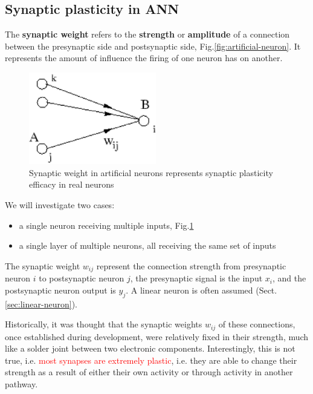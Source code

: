 \subsection{Synaptic plasticity in ANN}
\label{sec:synaptic_plasticity-ANN}


The {\bf synaptic weight} refers to the {\bf strength} or {\bf amplitude} of a
connection between the presynaptic side and postsynaptic side,
Fig.\ref{fig:artificial-neuron}.
It represents the amount of influence the firing of one neuron has on another.

\begin{figure}[hbt]
  \centerline{
  \includegraphics[height=4cm,
    angle=0]{./images/synaptic_plasticity_efficacy.eps}}
\caption{Synaptic weight in artificial neurons represents synaptic plasticity
efficacy in real neurons}
\label{fig:synaptic_plasticity_efficacy}
\end{figure}

We will investigate two cases:
\begin{itemize}
  \item a single neuron receiving multiple inputs, Fig.\ref{fig:synaptic_plasticity_efficacy}
  \item a single layer of multiple neurons, all receiving the same set of inputs
\end{itemize}

The synaptic weight $w_{ij}$ represent the connection strength from presynaptic
neuron $i$ to postsynaptic neuron $j$, the presynaptic signal is the input
$x_i$, and the postsynaptic neuron output is $y_j$. A linear neuron is often
assumed (Sect.\ref{sec:linear-neuron}).

Historically, it was thought that the synaptic weights $w_{ij}$ of these
connections, once established during development, were relatively fixed in their
strength, much like a solder joint between two electronic components.
Interestingly, this is not true, i.e. \textcolor{red}{most synapses are
extremely plastic}, i.e. they are able to change their strength as a result of
either their own activity or through activity in another pathway.

